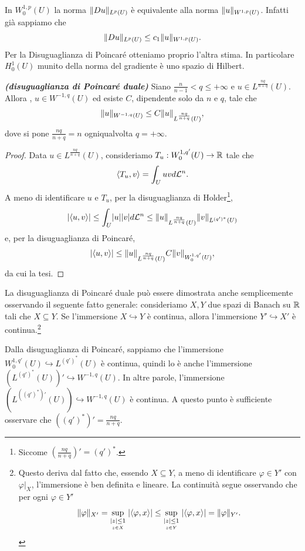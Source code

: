 \begin{osservazione}
	In $W^{1,p}_0(U)$ la norma $ \lVert Du\rVert_{L^p(U)} $ è equivalente alla norma $\lVert u\rVert_{W^{1,p}(U)}$. Infatti già sappiamo che
	\[ \lVert Du\rVert_{L^p(U)} \le c_1 \lVert u\rVert_{W^{1,p}(U)} . \]
	Per la Disuguaglianza di Poincaré otteniamo proprio l'altra stima. In particolare $H^{1}_0(U)$ munito della norma del gradiente è uno spazio di Hilbert.
\end{osservazione}

\begin{proposizione}\textbf{\emph{(disuguaglianza di Poincaré duale)}}\label{disPoincaréduale}
	Siano $\frac{n}{n-1} < q \le +\infty$ e $u \in L^{\frac{nq}{n+q}}(U)$. Allora , $u \in W^{-1,q}(U)$ ed esiste $C$, dipendente solo da $n$ e $q$, tale che 
	\[ \lVert u\rVert_{W^{-1,q}(U)} \le C\lVert u\rVert_{L^{\frac{nq}{n+q}}(U)}, \]
	dove si pone $\frac{nq}{n+q} = n$ ogniqualvolta $q=+\infty$.
\end{proposizione}
\begin{proof}
	Data $u \in  L^{\frac{nq}{n+q}}(U)$, consideriamo $T_u: W^{1,q'}_0(U) \to \mathbb{R}$ tale che 
	\[ \braket{T_u, v} = \int_U uvd\mathcal{L}^n. \]
	A meno di identificare $u$ e $T_u$, per la disuguaglianza di Holder\footnote{Siccome $\left( \frac{nq}{n+q}\right)' =(q')^\ast$.},
	\[ \lvert\braket{u,v}\rvert \le \int_U \lvert u\rvert \lvert v\rvert d\mathcal{L}^n \le \lVert u\rVert_{L^{\frac{nq}{n+q}}(U)} \lVert v\rVert_{L^{(q')^\ast}(U)}\]
	e, per la disuguaglianza di Poincaré,
	\[ \lvert\braket{u,v}\rvert \le  \lVert u\rVert_{L^{\frac{nq}{n+q}}(U)} C \lVert v\rVert_{W^{1,q'}_0(U)}, \]
	da cui la tesi.
\end{proof}
\begin{osservazione}
	La disuguaglianza di Poincaré duale può essere dimostrata anche semplicemente osservando il seguente fatto generale: consideriamo $X,Y$ due spazi di Banach su $\mathbb{R}$ tali che $X\subseteq Y$. Se l'immersione $X \hookrightarrow Y$ è continua, allora l'immersione $Y' \hookrightarrow X'$ è continua.\footnote{Questo deriva dal fatto che, essendo $X \subseteq Y$, a meno di identificare $\varphi \in Y'$ con $\varphi|_X$, l'immersione è ben definita e lineare. La continuità segue osservando che per ogni $\varphi \in Y'$
		\[ \lVert\varphi\rVert_{X'} = \underset{\underset{z \in X}{\lvert z\rvert\le 1}}{\sup}\; \lvert\braket{\varphi,x}\rvert \le  \underset{\underset{z \in Y}{\lvert z\rvert\le 1}}{\sup}\; \lvert\braket{\varphi,x}\rvert = \lVert\varphi\rVert_{Y'}.\]}
	
	Dalla disuguaglianza di Poincaré, sappiamo che l'immersione $W^{1,q'}_0(U)  \hookrightarrow L^{(q')^\ast}(U)$ è continua, quindi lo è anche l'immersione $(L^{(q')^\ast}(U))' \hookrightarrow W^{-1,q}(U)$. In altre parole, l'immersione $(L^{((q')^\ast)'}(U)) \hookrightarrow W^{-1,q}(U)$ è continua. A questo punto è sufficiente osservare che $((q')^\ast)' =\frac{nq}{n+q}$.
	
\end{osservazione}




